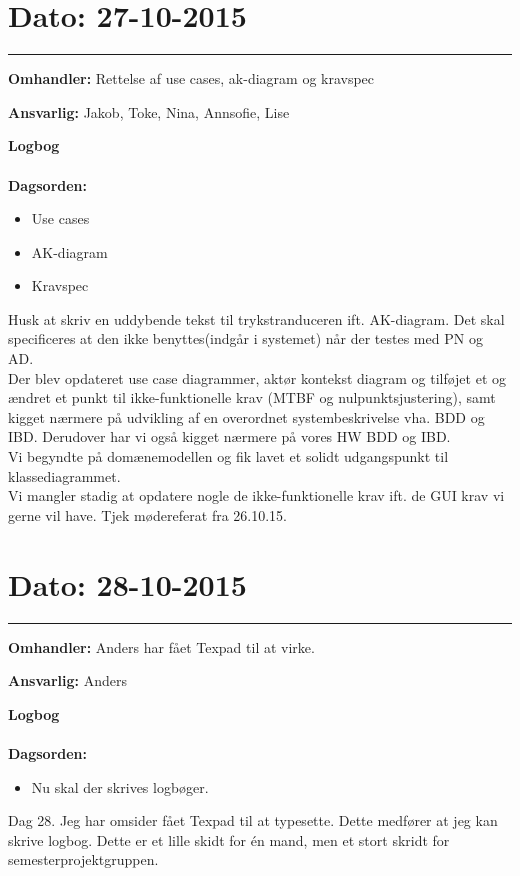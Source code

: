 \section{Dato: 27-10-2015 }
\hrule

\textbf{Omhandler:} Rettelse af use cases, ak-diagram og kravspec

\textbf{Ansvarlig:} Jakob, Toke, Nina, Annsofie, Lise 

\textbf{Logbog}
\\
\\
\textbf{Dagsorden:}
\begin{itemize}
	\item Use cases
	\item AK-diagram
	\item Kravspec
\end{itemize}

Husk at skriv en uddybende tekst til trykstranduceren ift. AK-diagram. Det skal specificeres at den ikke benyttes(indgår i systemet) når der testes med PN og AD.
\\
Der blev opdateret use case diagrammer, aktør kontekst diagram og tilføjet et og ændret et punkt til ikke-funktionelle krav (MTBF og nulpunktsjustering), samt kigget nærmere på udvikling af en overordnet systembeskrivelse vha. BDD og IBD. Derudover har vi også kigget nærmere på vores HW BDD og IBD.
\\
Vi begyndte på domænemodellen og fik lavet et solidt udgangspunkt til klassediagrammet. 
\\
Vi mangler stadig at opdatere nogle de ikke-funktionelle krav ift. de GUI krav vi gerne vil have. Tjek mødereferat fra 26.10.15.



\section{Dato: 28-10-2015 }
\hrule

\textbf{Omhandler:} Anders har fået Texpad til at virke. 

\textbf{Ansvarlig:} Anders
 
\textbf{Logbog}
\\
\\
\textbf{Dagsorden:}
\begin{itemize}
	\item Nu skal der skrives logbøger.
\end{itemize} 

Dag 28. Jeg har omsider fået Texpad til at typesette. Dette medfører at jeg kan skrive logbog. Dette er et lille skidt for én mand, men et stort skridt for semesterprojektgruppen.



